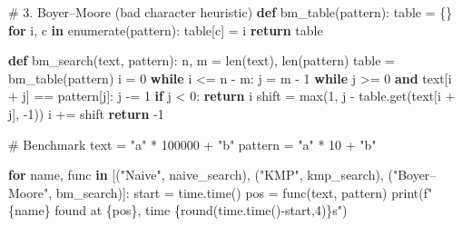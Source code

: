 \documentclass[
  letterpaper,
  DIV=11,
  numbers=noendperiod]{scrreprt}
\newenvironment{Shaded}{\begin{snugshade}}{\end{snugshade}}
\newcommand{\BuiltInTok}[1]{\textcolor[rgb]{0.00,0.23,0.31}{#1}}
\newcommand{\CommentTok}[1]{\textcolor[rgb]{0.37,0.37,0.37}{#1}}
\newcommand{\ControlFlowTok}[1]{\textcolor[rgb]{0.00,0.23,0.31}{\textbf{#1}}}
\newcommand{\DecValTok}[1]{\textcolor[rgb]{0.68,0.00,0.00}{#1}}
\newcommand{\KeywordTok}[1]{\textcolor[rgb]{0.00,0.23,0.31}{\textbf{#1}}}
\newcommand{\NormalTok}[1]{\textcolor[rgb]{0.00,0.23,0.31}{#1}}
\newcommand{\OperatorTok}[1]{\textcolor[rgb]{0.37,0.37,0.37}{#1}}
\newcommand{\SpecialCharTok}[1]{\textcolor[rgb]{0.37,0.37,0.37}{#1}}
\newcommand{\SpecialStringTok}[1]{\textcolor[rgb]{0.13,0.47,0.30}{#1}}
\newcommand{\StringTok}[1]{\textcolor[rgb]{0.13,0.47,0.30}{#1}}
\begin{document}
\begin{Shaded}
\begin{Highlighting}[]
\CommentTok{\# 3. Boyer–Moore (bad character heuristic)}
\KeywordTok{def}\NormalTok{ bm\_table(pattern):}
\NormalTok{    table }\OperatorTok{=}\NormalTok{ \{\}}
    \ControlFlowTok{for}\NormalTok{ i, c }\KeywordTok{in} \BuiltInTok{enumerate}\NormalTok{(pattern):}
\NormalTok{        table[c] }\OperatorTok{=}\NormalTok{ i}
    \ControlFlowTok{return}\NormalTok{ table}

\KeywordTok{def}\NormalTok{ bm\_search(text, pattern):}
\NormalTok{    n, m }\OperatorTok{=} \BuiltInTok{len}\NormalTok{(text), }\BuiltInTok{len}\NormalTok{(pattern)}
\NormalTok{    table }\OperatorTok{=}\NormalTok{ bm\_table(pattern)}
\NormalTok{    i }\OperatorTok{=} \DecValTok{0}
    \ControlFlowTok{while}\NormalTok{ i }\OperatorTok{\textless{}=}\NormalTok{ n }\OperatorTok{{-}}\NormalTok{ m:}
\NormalTok{        j }\OperatorTok{=}\NormalTok{ m }\OperatorTok{{-}} \DecValTok{1}
        \ControlFlowTok{while}\NormalTok{ j }\OperatorTok{\textgreater{}=} \DecValTok{0} \KeywordTok{and}\NormalTok{ text[i }\OperatorTok{+}\NormalTok{ j] }\OperatorTok{==}\NormalTok{ pattern[j]:}
\NormalTok{            j }\OperatorTok{{-}=} \DecValTok{1}
        \ControlFlowTok{if}\NormalTok{ j }\OperatorTok{\textless{}} \DecValTok{0}\NormalTok{:}
            \ControlFlowTok{return}\NormalTok{ i}
\NormalTok{        shift }\OperatorTok{=} \BuiltInTok{max}\NormalTok{(}\DecValTok{1}\NormalTok{, j }\OperatorTok{{-}}\NormalTok{ table.get(text[i }\OperatorTok{+}\NormalTok{ j], }\OperatorTok{{-}}\DecValTok{1}\NormalTok{))}
\NormalTok{        i }\OperatorTok{+=}\NormalTok{ shift}
    \ControlFlowTok{return} \OperatorTok{{-}}\DecValTok{1}

\CommentTok{\# Benchmark}
\NormalTok{text }\OperatorTok{=} \StringTok{"a"} \OperatorTok{*} \DecValTok{100000} \OperatorTok{+} \StringTok{"b"}
\NormalTok{pattern }\OperatorTok{=} \StringTok{"a"} \OperatorTok{*} \DecValTok{10} \OperatorTok{+} \StringTok{"b"}

\ControlFlowTok{for}\NormalTok{ name, func }\KeywordTok{in}\NormalTok{ [(}\StringTok{"Naive"}\NormalTok{, naive\_search), (}\StringTok{"KMP"}\NormalTok{, kmp\_search), (}\StringTok{"Boyer–Moore"}\NormalTok{, bm\_search)]:}
\NormalTok{    start }\OperatorTok{=}\NormalTok{ time.time()}
\NormalTok{    pos }\OperatorTok{=}\NormalTok{ func(text, pattern)}
    \BuiltInTok{print}\NormalTok{(}\SpecialStringTok{f"}\SpecialCharTok{\{}\NormalTok{name}\SpecialCharTok{\}}\SpecialStringTok{ found at }\SpecialCharTok{\{}\NormalTok{pos}\SpecialCharTok{\}}\SpecialStringTok{, time }\SpecialCharTok{\{}\BuiltInTok{round}\NormalTok{(time.time()}\OperatorTok{{-}}\NormalTok{start,}\DecValTok{4}\NormalTok{)}\SpecialCharTok{\}}\SpecialStringTok{s"}\NormalTok{)}
\end{Highlighting}
\end{Shaded}
\end{document}
